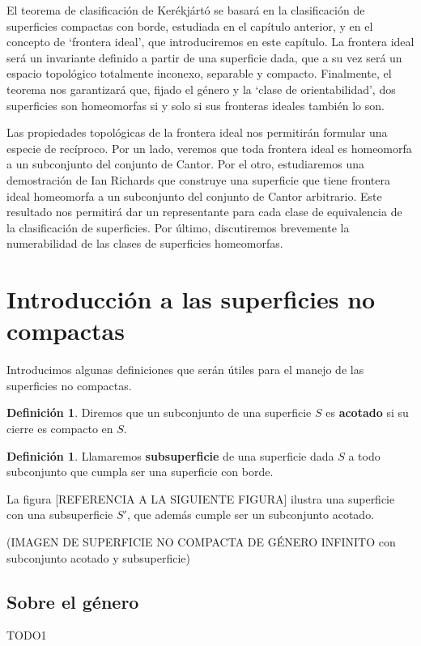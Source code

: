 \documentclass[a4paper,11pt,spanish, twoside, leqno]{tfg-uam}
\theoremstyle{definition}
\newtheorem{defin}[teor]{Definici\'on}
\begin{document}
El teorema de clasificación de Kerékjártó se basará en la clasificación de superficies compactas con borde, estudiada en el capítulo anterior, y en el concepto de `frontera ideal', que introduciremos en este capítulo. La frontera ideal será un invariante  definido a partir de una superficie dada, que a su vez será un espacio topológico totalmente inconexo, separable y compacto. Finalmente, el teorema nos garantizará que, fijado el género y la `clase de orientabilidad', dos superficies son homeomorfas si y solo si sus fronteras ideales también lo son.

Las propiedades topológicas de la frontera ideal nos permitirán formular una especie de recíproco. Por un lado, veremos que toda frontera ideal es homeomorfa a un subconjunto del conjunto de Cantor. Por el otro, estudiaremos una demostración de Ian Richards que construye una superficie que tiene frontera ideal homeomorfa a un subconjunto del conjunto de Cantor arbitrario. Este resultado nos permitirá dar un representante para cada clase de equivalencia de la clasificación de superficies. Por último, discutiremos brevemente la numerabilidad de las clases de superficies homeomorfas. 


\section{Introducción a las superficies no compactas}
Introducimos algunas definiciones que serán útiles para el manejo de las superficies no compactas.

\begin{defin}
Diremos que un subconjunto de una superficie $S$ es \textbf{acotado} si su cierre es compacto en $S$.
\end{defin}

\begin{defin}
Llamaremos \textbf{subsuperficie} de una superficie dada $S$ a todo subconjunto que cumpla ser una superficie con borde.
\end{defin} 

La figura [REFERENCIA A LA SIGUIENTE FIGURA] ilustra una superficie con una subsuperficie $S'$, que además cumple ser un subconjunto acotado. 

(IMAGEN DE SUPERFICIE NO COMPACTA DE GÉNERO INFINITO con subconjunto acotado y subsuperficie)

\subsection{Sobre el género}
TODO1
\end{document}
